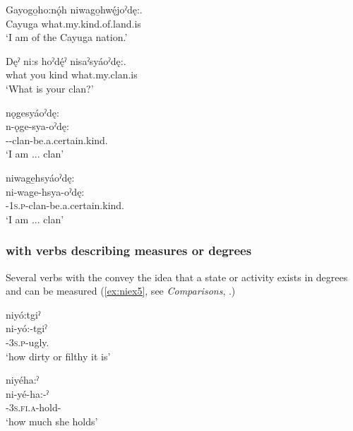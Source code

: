 \ex
\gll Gayogo̱ho:nǫ́h niwago̱hwę́joˀdę:. \\
Cayuga  what.my.kind.of.land.is\\
\glt ‘I am of the Cayuga nation.’ 

\ex
\gll Dęˀ ni:s hoˀdę́ˀ nisaˀsyáoˀdę:. \\
 what you kind what.my.clan.is \\
\glt ‘What is your clan?’ 


\ex nǫgesyáoˀdę:\\
\gll n-ǫge-sya-oˀdę:\\
{\partitive}--clan-be.a.certain.kind.{\stative}\\
\glt `I am ... clan'

\ex niwage̱hsyáoˀdę:\\
\gll ni-wage-hsya-oˀdę:\\
{\partitive}-\textsc{1s.p}-clan-be.a.certain.kind.{\stative}\\
\glt `I am ... clan'
\z
\z


\subsubsection*{ {\partitive} with verbs describing measures or degrees} \label{[ni-] (partitive) with verbs describing measures or degrees}
Several verbs with the  \textsc{\partitive} convey the idea that a state or activity exists in degrees and can be measured (\ref{ex:niex5}, see \textit{Comparisons}, .)

\ea\label{ex:niex5} 

\ea niyó:tgiˀ\\
\gll ni-yó:-tgiˀ\\
{\partitive}-\textsc{3s.p}-ugly.{\stative}\\
\glt `how dirty or filthy it is'

\ex niyéha:ˀ\\
\gll ni-yé-ha:-ˀ\\
{\partitive}-\textsc{3s.fi.a}-hold-{\habitual}\\
\glt `how much she holds'

